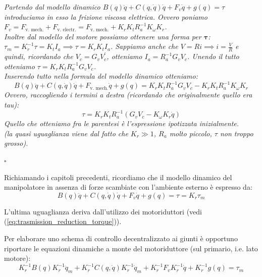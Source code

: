 \begin{mdframed}[leftmargin=15pt, rightmargin=15pt, leftline=false, rightline=false]
\textit{
Partendo dal modello dinamico {\boldmath$B(q)\ddot{q} + C(q, \dot{q})\dot{q} + F_v\dot{q} + g(q) = \tau$} introduciamo in esso la frizione viscosa elettrica. Ovvero poniamo {\boldmath$F_v = F_\text{v. mech.} + F_\text{v. electr.} = F_\text{v. mech.} + K_rK_tR_a^{-1}K_\omega K_r$}. \\
Inoltre dal modello del motore possiamo ottenere una forma per $\boldsymbol{\tau}$: 
{\boldmath$\tau_m = K_r^{-1} \tau = K_t I_a \implies \tau = K_r K_t I_a$}. Sappiamo anche che $V = Ri \implies i = \frac{V}{R}$ e quindi, ricordando che {\boldmath$V_c = G_v V_c^{'}$}, otteniamo {\boldmath $I_a = R_a^{-1}G_v V_c$}. Unendo il tutto otteniamo {\boldmath $\tau = K_r K_t R_a^{-1}G_v V_c$}.\\
Inserendo tutto nella formula del modello dinamico otteniamo:
\boldmath
$$
B(q)\ddot{q} + C(q, \dot{q})\dot{q} + F_{\text{v. mech.}}\dot{q} + g(q) = K_r K_t R_a^{-1}G_v V_c - K_rK_tR_a^{-1}K_\omega K_r
$$
Ovvero, raccogliendo i termini a destra (ricordando che originalmente quello era tau):
$$
\tau =  K_r K_t R_a^{-1}(G_v V_c - K_\omega K_r \dot{q})
$$
Quello che otteniamo fra le parentesi è l'espressione ipotizzata inizialmente.\\
(la quasi uguaglianza viene dal fatto che $K_r \gg 1$, $R_a$ molto piccolo, $\tau$ non troppo grosso).
}

\raggedleft $\square$
\end{mdframed}


\vspace*{25pt}



Richiamando i capitoli precedenti, ricordiamo che il modello dinamico del manipolatore in assenza di forze scambiate con l’ambiente esterno è espresso da:
\boldmath
\begin{equation}\label{eq:dynamic_no_ext_forces}
B(q)\ddot{q} + C(q, \dot{q})\dot{q} + F_v\dot{q} + g(q) = \tau = K_r \tau_m
\end{equation}
\unboldmath

L'ultima uguaglianza deriva dall'utilizzo dei motoriduttori (vedi (\ref{eq:trasmission_reduction_torque})).

Per elaborare uno schema di controllo decentralizzato ai giunti è opportuno riportare le equazioni dinamiche a monte del motoriduttore (sul primario, i.e. lato motore):
\boldmath
$$
K_r^{-1}B(q)K_r^{-1}\ddot{q}_m + K_r^{-1}C(q, \dot{q})K_r^{-1}\dot{q}_m + K_r^{-1}F_vK_r^{-1}\dot{q} + K_r^{-1}g(q) = \tau_m
$$
\unboldmath

